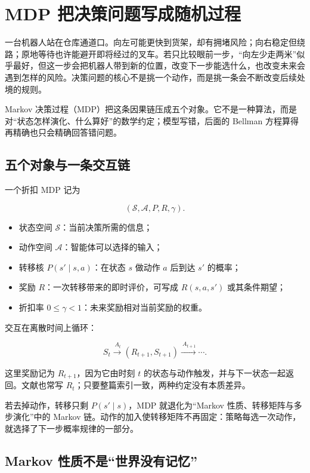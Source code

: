 \section{MDP 把决策问题写成随机过程}

一台机器人站在仓库通道口。向左可能更快到货架，却有拥堵风险；向右稳定但绕路；原地等待也许能避开即将经过的叉车。若只比较眼前一步，``向左少走两米''似乎最好，但这一步会把机器人带到新的位置，改变下一步能选什么，也改变未来会遇到怎样的风险。决策问题的核心不是挑一个动作，而是挑一条会不断改变后续处境的规则。

Markov 决策过程（MDP）把这条因果链压成五个对象。它不是一种算法，而是对``状态怎样演化、什么算好''的数学约定；模型写错，后面的 Bellman 方程算得再精确也只会精确回答错问题。

\subsection{五个对象与一条交互链}

一个折扣 MDP 记为

\[
(\mathcal S,\mathcal A,P,R,\gamma).
\]

\begin{itemize}
\tightlist
\item
  状态空间 \(\mathcal S\)：当前决策所需的信息；
\item
  动作空间 \(\mathcal A\)：智能体可以选择的输入；
\item
  转移核 \(P(s'\mid s,a)\)：在状态 \(s\) 做动作 \(a\) 后到达 \(s'\) 的概率；
\item
  奖励 \(R\)：一次转移带来的即时评价，可写成 \(R(s,a,s')\) 或其条件期望；
\item
  折扣率 \(0\le\gamma<1\)：未来奖励相对当前奖励的权重。
\end{itemize}

交互在离散时间上循环：

\[
S_t
\xrightarrow{\ A_t}
(R_{t+1},S_{t+1})
\xrightarrow{\ A_{t+1}}
\cdots .
\]

这里奖励记为 \(R_{t+1}\)，因为它由时刻 \(t\) 的状态与动作触发，并与下一状态一起返回。文献也常写 \(R_t\)；只要整篇索引一致，两种约定没有本质差异。

若去掉动作，转移只剩 \(P(s'\mid s)\)，MDP 就退化为``Markov 性质、转移矩阵与多步演化''中的 Markov 链。动作的加入使转移矩阵不再固定：策略每选一次动作，就选择了下一步概率规律的一部分。

\subsection{Markov 性质不是``世界没有记忆''}

